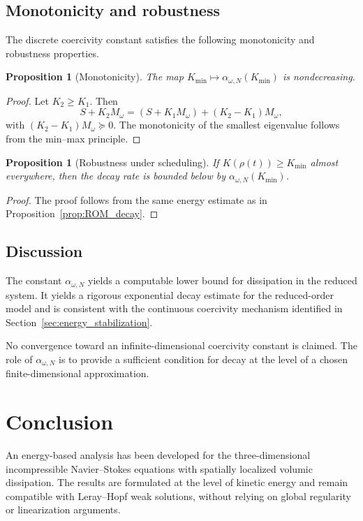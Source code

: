 \documentclass[preprint,12pt]{elsarticle}
\newtheorem{proposition}  [theorem]{Proposition}
\begin{document}
\subsection{Monotonicity and robustness}
The discrete coercivity constant satisfies the following monotonicity and robustness properties.
\begin{proposition}[Monotonicity]
\label{prop:alpha_monotone}
The map $K_{\min}\mapsto \alpha_{\omega,N}(K_{\min})$ is nondecreasing.
\end{proposition}

\begin{proof}
Let $K_2\ge K_1$. Then
\[
S+K_2M_\omega = (S+K_1M_\omega) + (K_2-K_1)M_\omega,
\]
with $(K_2-K_1)M_\omega \succeq 0$.
The monotonicity of the smallest eigenvalue follows from the min--max principle.
\end{proof}

\begin{proposition}[Robustness under scheduling]
\label{prop:alpha_lpv}
If $K(\rho(t))\ge K_{\min}$ almost everywhere, then the decay rate is bounded
below by $\alpha_{\omega,N}(K_{\min})$.
\end{proposition}

\begin{proof}
The proof follows from the same energy estimate as in
Proposition~\ref{prop:ROM_decay}.
\end{proof}

\subsection{Discussion}
The constant $\alpha_{\omega,N}$ yields a computable lower bound for
dissipation in the reduced system.
It yields a rigorous exponential decay estimate for the reduced-order model and
is consistent with the continuous coercivity mechanism identified in
Section~\ref{sec:energy_stabilization}.

No convergence toward an infinite-dimensional coercivity constant is claimed.
The role of $\alpha_{\omega,N}$ is to provide a sufficient condition for decay at
the level of a chosen finite-dimensional approximation.

\section{Conclusion}

An energy-based analysis has been developed for the three-dimensional
incompressible Navier--Stokes equations with spatially localized volumic
dissipation.
The results are formulated at the level of kinetic energy and remain compatible
with Leray--Hopf weak solutions, without relying on global regularity or
linearization arguments.
\end{document}
